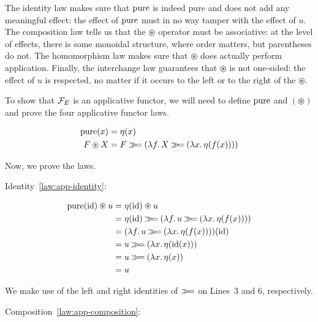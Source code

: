 The identity law makes sure that $\operatorname{pure}$ is indeed pure and does not add
any meaningful effect: the effect of $\operatorname{pure}$ must in no way tamper with the
effect of $u$. The composition law tells us that the $\circledast$ operator
must be associative: at the level of effects, there is some monoidal
structure, where order matters, but parentheses do not. The homomorphism
law makes sure that $\circledast$ does actually perform
application. Finally, the interchange law guarantees that $\circledast$ is
not one-sided: the effect of $u$ is respected, no matter if it occurs to
the left or to the right of the $\circledast$.

To show that $\mathcal{F}_E$ is an applicative functor, we will need to define
$\operatorname{pure}$ and $(\circledast)$ and prove the four applicative functor laws.

\begin{align*}
  \operatorname{pure}(x) &= \eta(x) \\
  F \circledast X &= F \mathbin{\gg\!=} (\lambda f.\, X \mathbin{\gg\!=} (\lambda x.\, \eta(f(x))))
\end{align*}

Now, we prove the laws.

Identity~\eqref{law:app-identity}:

\setcounter{TemporaryCounter}{\value{equation}}
\setcounter{equation}{0}
\NoChapterPrefix
\begin{align}
  \operatorname{pure}(\mathrm{id}) \circledast u
  &= \eta(\mathrm{id}) \circledast u \\
  &= \eta(\mathrm{id}) \mathbin{\gg\!=} (\lambda f.\, u \mathbin{\gg\!=} (\lambda x.\, \eta(f(x)))) \\
  &= (\lambda f.\, u \mathbin{\gg\!=} (\lambda x.\, \eta(f(x))))(\mathrm{id}) \\
  &= u \mathbin{\gg\!=} (\lambda x.\, \eta(\mathrm{id}(x))) \\
  &= u \mathbin{\gg\!=} (\lambda x.\, \eta(x)) \\
  &= u
\end{align}
\setcounter{equation}{\value{TemporaryCounter}}
\ChapterPrefix

We make use of the left and right identities of $\mathbin{\gg\!=}$ on Lines~3 and 6,
respectively.

Composition~\eqref{law:app-composition}:


